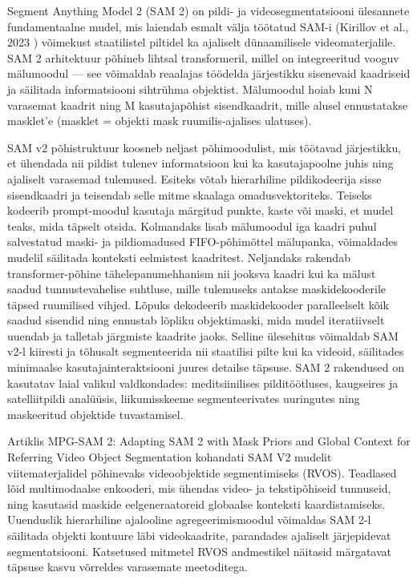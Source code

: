 Segment Anything Model 2 (SAM 2) on pildi- ja videosegmentatsiooni ülesannete
fundamentaalne mudel, mis laiendab esmalt välja töötatud SAM-i  (Kirillov et al., 2023 \cite{kirillovSegmentAnything2023})
 võimekust staatilistel piltidel ka ajaliselt dünaamilisele
videomaterjalile. SAM 2 arhitektuur põhineb lihtsal transformeril, millel on
integreeritud vooguv mälumoodul --- see võimaldab reaalajas töödelda järjestikku
sisenevaid kaadriseid ja säilitada informatsiooni sihtrühma objektist.
Mälumoodul hoiab kuni N varasemat kaadrit ning M kasutajapõhist sisendkaadrit,
mille alusel ennustatakse masklet'e (masklet = objekti mask ruumilis-ajalises ulatuses). \cite{raviSAM2Segment2024}

SAM v2 põhistruktuur koosneb neljast põhimoodulist, mis töötavad järjestikku, et
ühendada nii pildist tulenev informatsioon kui ka kasutajapoolne juhis ning
ajaliselt varasemad tulemused. Esiteks võtab hierarhiline pildikodeerija sisse
sisendkaadri ja teisendab selle mitme skaalaga
omadusvektoriteks. Teiseks kodeerib prompt-moodul kasutaja märgitud punkte,
kaste või maski, et mudel teaks, mida täpselt otsida. Kolmandaks lisab
mälumoodul iga kaadri puhul salvestatud maski- ja pildiomadused FIFO-põhimõttel
mälupanka, võimaldades mudelil säilitada konteksti eelmistest kaadritest.
Neljandaks rakendab transformer-põhine tähelepanumehhanism nii jooksva kaadri
kui ka mälust saadud tunnustevahelise suhtluse, mille tulemuseks antakse
maskidekooderile täpsed ruumilised vihjed. Lõpuks dekodeerib maskidekooder
paralleelselt kõik saadud sisendid ning ennustab lõpliku objektimaski, mida mudel
iteratiivselt uuendab ja talletab järgmiste kaadrite jaoks. Selline ülesehitus
võimaldab SAM v2-l kiiresti ja tõhusalt segmenteerida nii staatilisi pilte kui
ka videoid, säilitades minimaalse kasutajainteraktsiooni juures detailse täpsuse.
SAM 2 rakendused on kasutatav laial valikul valdkondades: meditsiinilises pilditöötluses,
kaugseires ja satelliitpildi analüüsis, liikumisskeeme segmenteerivates uuringutes ning
maskeeritud objektide tuvastamisel. \cite{raviSAM2Segment2024}

Artiklis  \glqq MPG-SAM 2: Adapting SAM 2 with Mask Priors and Global Context for Referring Video Object Segmentation\grqq{} kohandati SAM V2 mudelit viitematerjalidel põhinevaks
videoobjektide segmentimiseks (RVOS). Teadlased lõid multimodaalse enkooderi,
mis ühendas video- ja tekstipõhiseid tunnuseid, ning kasutasid maskide
eelgeneraatoreid globaalse konteksti kaardistamiseks. Uuenduslik hierarhiline
ajalooline agregeerimismoodul võimaldas SAM 2-l säilitada objekti kontuure läbi
videokaadrite, parandades ajaliselt järjepidevat segmentatsiooni. Katsetused
mitmetel RVOS andmestikel näitasid märgatavat täpsuse kasvu võrreldes varasemate
meetoditega. \cite{rongMPGSAM2Adapting2025}


